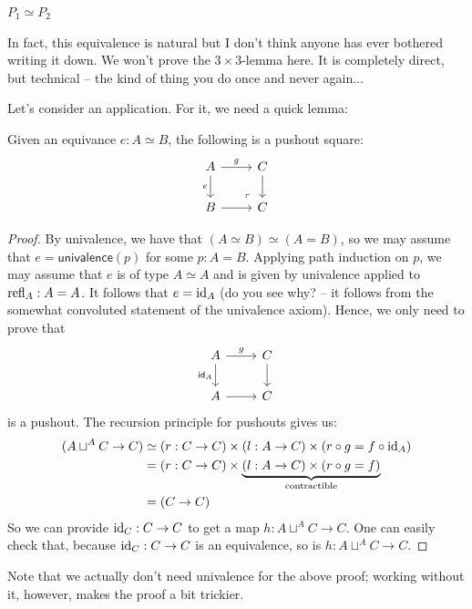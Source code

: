\documentclass[10pt,oneside,leqno,openright]{memoir}
\begin{document}
\begin{lemma}
  $P_1 \simeq P_2$
\end{lemma}
In fact, this equivalence is natural but I don't think anyone has ever bothered writing it down.
%
We won't prove the $3\times 3$-lemma here. It is completely direct, but technical -- the kind of thing you do once and never again... 

Let's consider an application. For it, we need a quick lemma:
\begin{lemma}
  Given an equivance $e:A \simeq B$, the following is a pushout square:
  \[\begin{tikzcd}[ampersand replacement=\&]
	A \& C \\
	B \& C
	\arrow["g", from=1-1, to=1-2]
	\arrow["e"', from=1-1, to=2-1]
	\arrow[from=1-2, to=2-2]
	\arrow[from=2-1, to=2-2]
	\arrow["\lrcorner"{anchor=center, pos=0.125, rotate=180}, draw=none, from=2-2, to=1-1]
\end{tikzcd}\]
\end{lemma}
\begin{proof}
  By univalence, we have that $(A \simeq B) \simeq (A = B)$, so we may assume that $e = \mathsf{univalence}(p)$ for some $p: A = B$. Applying path induction on $p$, we may assume that $e$ is of type $A \simeq A$ and is given by univalence applied to $\mathrm{refl}_A : A = A$. It follows that $e = \operatorname{id}_A$ (do you see why? -- it follows from the somewhat convoluted statement of the univalence axiom). Hence, we only need to prove that
\[\begin{tikzcd}[ampersand replacement=\&]
	A \& C \\
	A \& C
	\arrow["g", from=1-1, to=1-2]
	\arrow["{\mathsf{id}_A}"', from=1-1, to=2-1]
	\arrow[from=1-2, to=2-2]
	\arrow[from=2-1, to=2-2]
\end{tikzcd}\]
is a pushout. The recursion principle for pushouts gives us:
\begin{align*}
  (A \sqcup^A C \to C) &\simeq (r : C \to C) \times (l : A \to C) \times (r \circ g = f \circ \operatorname{id}_A) \\
  &= (r : C \to C) \times \underset{\text{contractible}}{\underbrace{(l : A \to C) \times (r \circ g = f)}}\\
  &= (C \to C)
\end{align*}
So we can provide $\operatorname{id}_C : C \to C$  to get a map $h : A \sqcup^A C \to C$. One can easily check that, because $\operatorname{id}_C : C \to C$ is an equivalence, so is $h : A \sqcup^A C \to C$.
\end{proof}
Note that we actually don't need univalence for the above proof; working without it, however, makes the proof a bit trickier.
\end{document}
